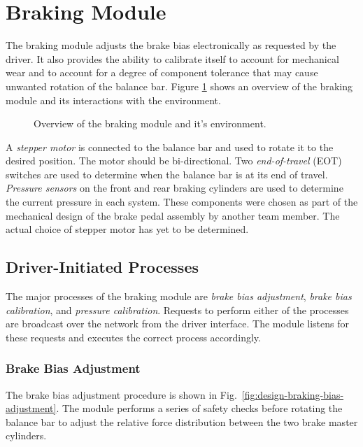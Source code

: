 \section{Braking Module\label{sec:Braking-Module-Design}}

The braking module adjusts the brake bias electronically as requested by the driver. It also provides the ability to calibrate itself to account for mechanical wear and to account for a degree of component tolerance that may cause unwanted rotation of the balance bar. Figure \ref{fig:design_brake_overview_block} shows an overview of the braking module and its interactions with the environment. 

\begin{figure}[H]
\centering

\caption{Overview of the braking module and it's environment.}
\label{fig:design_brake_overview_block}
\end{figure}

A \emph{stepper motor} is connected to the balance bar and used to rotate it to the desired position. The motor should be bi-directional. Two \emph{end-of-travel} (EOT) switches are used to determine when the balance bar is at its end of travel. \emph{Pressure sensors} on the front and rear braking cylinders are used to determine the current pressure in each system. These components were chosen as part of the mechanical design of the brake pedal assembly by another team member. The actual choice of stepper motor has yet to be determined.

\subsection{Driver-Initiated Processes \label{sec:braking_processes}}

The major processes of the braking module are \emph{brake bias adjustment}, \emph{brake bias calibration}, and \emph{pressure calibration}. Requests to perform either of the processes are broadcast over the network from the driver interface. The module listens for these requests and executes the correct process accordingly. 

\subsubsection{Brake Bias Adjustment}

The brake bias adjustment procedure is shown in Fig.\ \ref{fig:design-braking-bias-adjustment}. The module performs a series of safety checks before rotating the balance bar to adjust the relative force distribution between the two brake master cylinders.

